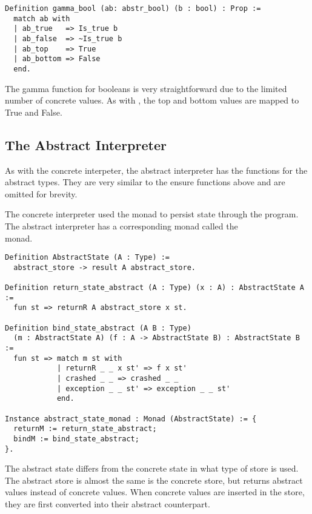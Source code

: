 \begin{verbatim}
Definition gamma_bool (ab: abstr_bool) (b : bool) : Prop :=
  match ab with
  | ab_true   => Is_true b
  | ab_false  => ~Is_true b
  | ab_top    => True
  | ab_bottom => False
  end.
\end{verbatim}

The gamma function for booleans is very straightforward due to the limited
number of concrete values. As with , the top and bottom
values are mapped to True and False.

\subsection{The Abstract Interpreter}
As with the concrete interpeter, the abstract interpreter has the
 functions for the abstract types. 
They are very similar to the ensure functions above and are omitted for brevity. 

The concrete interpreter used the  monad to persist state through
the program. The abstract interpreter has a corresponding monad called the \\
 monad.

\begin{verbatim}
Definition AbstractState (A : Type) :=
  abstract_store -> result A abstract_store.

Definition return_state_abstract (A : Type) (x : A) : AbstractState A :=
  fun st => returnR A abstract_store x st.

Definition bind_state_abstract (A B : Type) 
  (m : AbstractState A) (f : A -> AbstractState B) : AbstractState B :=
  fun st => match m st with
            | returnR _ _ x st' => f x st'
            | crashed _ _ => crashed _ _
            | exception _ _ st' => exception _ _ st' 
            end.

Instance abstract_state_monad : Monad (AbstractState) := {
  returnM := return_state_abstract;
  bindM := bind_state_abstract;
}.
\end{verbatim}

The abstract state differs from the concrete state in what type of store is
used. The abstract store is almost the same is the concrete store, but returns
abstract values instead of concrete values. When concrete values are inserted
in the store, they are first converted into their abstract counterpart.


